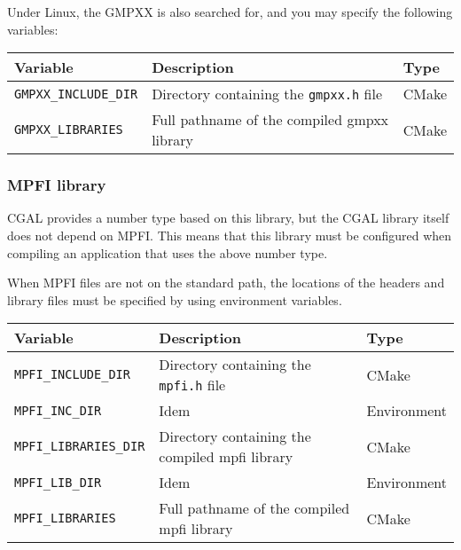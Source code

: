 Under Linux, the GMPXX is also searched for, and you may specify the following variables:

{\ccTexHtml{\small}{}
\renewcommand{\arraystretch}{1.3}
\gdef\lcTabularBorder{2}
\begin{tabular}{|l|l|l|} \hline
  \textbf{Variable}             & \textbf{Description}                           & \textbf{Type}\\\hline\hline
  \texttt{GMPXX\_INCLUDE\_DIR}  & Directory containing the \texttt{gmpxx.h} file & CMake\\\hline
  \texttt{GMPXX\_LIBRARIES}     & Full pathname of the compiled gmpxx library    & CMake\\\hline
\end{tabular}
}

\subsubsection{MPFI library}

CGAL provides a number type based on this library, but the CGAL library
itself does not depend on MPFI. This means that this library must be
configured when compiling an application that uses the above number type.

When MPFI files are not on the standard path, the locations of the headers
and library files must be specified by using environment variables.

{\ccTexHtml{\small}{}
\renewcommand{\arraystretch}{1.3}
\gdef\lcTabularBorder{2}
\begin{tabular}{|l|l|l|} \hline
  \textbf{Variable}             & \textbf{Description}                                  & \textbf{Type}\\\hline\hline
  \texttt{MPFI\_INCLUDE\_DIR}   & Directory containing the \texttt{mpfi.h} file         & CMake\\\hline
  \texttt{MPFI\_INC\_DIR}       & Idem                                                  & Environment\\\hline
  \texttt{MPFI\_LIBRARIES\_DIR} & Directory containing the compiled mpfi library        & CMake\\\hline
  \texttt{MPFI\_LIB\_DIR}       & Idem                                                  & Environment\\\hline
  \texttt{MPFI\_LIBRARIES}      & Full pathname of the compiled mpfi library            & CMake\\\hline
\end{tabular}
}


